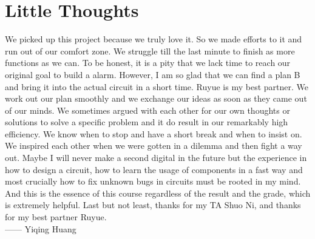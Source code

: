 \documentclass[12pt]{article}
\begin{document}
\section{Little Thoughts}
\par\setlength{\parindent}{2em}
We picked up this project because we truly love it. So we made efforts to it and run out of our comfort zone. We struggle till the last minute to finish as more functions as we can.
To be honest, it is a pity that we lack time to reach our original goal to build a alarm. However, I am so glad that we can find a plan B and bring it into the actual circuit in a short time. 
Ruyue is my best partner. We work out our plan smoothly and we exchange our ideas as soon as they came out of our minds. We sometimes argued with each other for our own thoughts or solutions to solve a specific problem and it do result in our remarkably high efficiency. We know when to stop and have a short break and when to insist on. We inspired each other when we were gotten in a dilemma and then fight a way out. 
Maybe I will never make a second digital in the future but the experience in how to design a circuit, how to learn the usage of components in a fast way and most crucially how to fix unknown bugs in circuits must be rooted in my mind. And this is the essence of this course regardless of the result and the grade, which is extremely helpful. 
Last but not least, thanks for my TA Shuo Ni, and thanks for my best partner Ruyue.\\
—— Yiqing Huang\\
\end{document}
